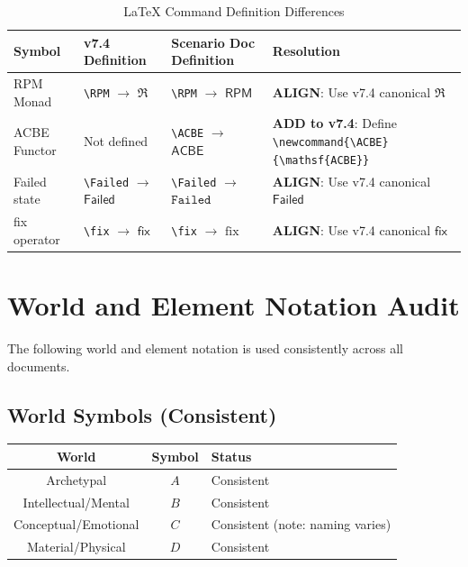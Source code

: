 \documentclass[11pt]{article}
\begin{document}
\begin{longtable}{L{2.5cm}|L{3.5cm}|L{3.5cm}|L{3.5cm}}
\caption{LaTeX Command Definition Differences} \\
\toprule
\textbf{Symbol} & \textbf{v7.4 Definition} & \textbf{Scenario Doc Definition} & \textbf{Resolution} \\
\midrule
\endfirsthead
\midrule
\endhead
\bottomrule
\endlastfoot

RPM Monad
& \verb|\RPM| $\to$ $\mathfrak{R}$
& \verb|\RPM| $\to$ $\mathsf{RPM}$
& \textbf{ALIGN}: Use v7.4 canonical $\mathfrak{R}$ \\

\midrule
ACBE Functor
& Not defined
& \verb|\ACBE| $\to$ $\mathsf{ACBE}$
& \textbf{ADD to v7.4}: Define \verb|\newcommand{\ACBE}{\mathsf{ACBE}}| \\

\midrule
Failed state
& \verb|\Failed| $\to$ $\mathsf{Failed}$
& \verb|\Failed| $\to$ $\mathtt{Failed}$
& \textbf{ALIGN}: Use v7.4 canonical $\mathsf{Failed}$ \\

\midrule
fix operator
& \verb|\fix| $\to$ $\mathsf{fix}$
& \verb|\fix| $\to$ $\mathrm{fix}$
& \textbf{ALIGN}: Use v7.4 canonical $\mathsf{fix}$ \\

\end{longtable}

\section{World and Element Notation Audit}

\begin{tcolorbox}[colback=green!5!white,colframe=green!65!black,title=\textbf{Consistent Usage Confirmed}]
The following world and element notation is used consistently across all documents.
\end{tcolorbox}

\subsection{World Symbols (Consistent)}
\begin{center}
\begin{tabular}{c|c|l}
\toprule
\textbf{World} & \textbf{Symbol} & \textbf{Status} \\
\midrule
Archetypal & $A$ & Consistent \\
Intellectual/Mental & $B$ & Consistent \\
Conceptual/Emotional & $C$ & Consistent (note: naming varies) \\
Material/Physical & $D$ & Consistent \\
\bottomrule
\end{tabular}
\end{center}
\end{document}
